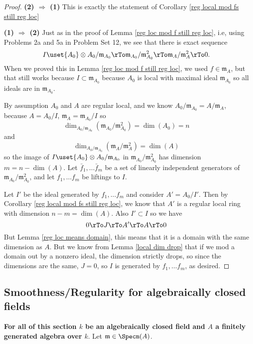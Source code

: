 \documentclass[12 pt]{article}
\theoremstyle{definition}
\begin{document}
\begin{proof} \textbf{(2) $\Rightarrow$ (1)} This is exactly the statement of Corollary \ref{reg local mod fs still reg loc}

\noindent \textbf{(1) $\Rightarrow$ (2)} Just as in the proof of Lemma \ref{reg loc mod f still reg loc}, i.e, using Problems 2a and 5a in Problem Set 12, we see that there is exact sequence
\[I \uset{A_0}\otimes A_0/\mathfrak{m}_{A_0} \rTo \mathfrak{m}_{A_0}/\mathfrak{m}_{A_0}^2 \rTo \mathfrak{m}_{A}/\mathfrak{m}_{A}^2  \rTo 0.\]
When we proved this in Lemma \ref{reg loc mod f still reg loc}, we used $f \in \mathfrak{m}_A$, but that still works because $I \subset \mathfrak{m}_{A_0}$ because $A_0$ is local with maximal ideal $\mathfrak{m}_{A_0}$ so all ideals are in $\mathfrak{m}_{A_0}$.

By assumption $A_0$ and $A$ are regular local, and we know $A_0/\mathfrak{m}_{A_0}=A/\mathfrak{m}_A$, because $A=A_0/I$, $\mathfrak{m}_A=\mathfrak{m}_{A_0}/I$ so
\[\dim_{A_0/\mathfrak{m}_{A_0}}(\mathfrak{m}_{A_0}/\mathfrak{m}_{A_0}^2)=\dim(A_0)=n\]
and
\[\dim_{A_0/\mathfrak{m}_{A_0}}(\mathfrak{m}_{A}/\mathfrak{m}_{A}^2)=\dim(A)\]
so the image of $I \uset{A_0}\otimes A_0/\mathfrak{m}_{A_0}$ in $\mathfrak{m}_{A_0}/\mathfrak{m}_{A_0}^2$ has dimension $m=n-\dim(A)$. Let $\bar{f}_1, \ldots \bar{f}_m$ be a set of linearly independent generators of $\mathfrak{m}_{A_0}/\mathfrak{m}_{A_0}^2$, and let $f_1, \ldots f_m$ be liftings to $I$.

Let $I'$ be the ideal generated by $f_1, \ldots f_m$ and consider $A'=A_0/I'$. Then by Corollary \ref{reg local mod fs still reg loc}, we know that $A'$ is a regular local ring with dimension $n-m=\dim(A)$. Also $I' \subset I$ so we have
\[0 \rTo J \rTo A' \rTo A \rTo 0\]
But Lemma \ref{reg loc means domain}, this means that it is a domain with the same dimension as $A$. But we know from Lemma \ref{local dim drop} that if we mod a domain out by a nonzero ideal, the dimension strictly drops, so since the dimensions are the same, $J=0$, so $I$ is generated by $f_1, \ldots f_m$, as desired.

\end{proof}

\subsection{Smoothness/Regularity for algebraically closed fields}

\textbf{For all of this section $k$ be an algebraically closed field and $A$ a finitely generated algebra over $k$}. Let $\mathfrak{m} \in \Specm(A)$.
\end{document}
